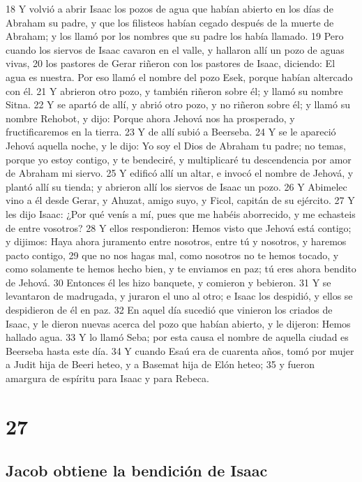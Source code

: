 18 Y volvió a abrir Isaac los pozos de agua que habían abierto en los días de Abraham su padre, y que los filisteos habían cegado después de la muerte de Abraham; y los llamó por los nombres que su padre los había llamado.
19 Pero cuando los siervos de Isaac cavaron en el valle, y hallaron allí un pozo de aguas vivas,
20 los pastores de Gerar riñeron con los pastores de Isaac, diciendo: El agua es nuestra. Por eso llamó el nombre del pozo Esek, porque habían altercado con él.
21 Y abrieron otro pozo, y también riñeron sobre él; y llamó su nombre Sitna.
22 Y se apartó de allí, y abrió otro pozo, y no riñeron sobre él; y llamó su nombre Rehobot, y dijo: Porque ahora Jehová nos ha prosperado, y fructificaremos en la tierra.
23 Y de allí subió a Beerseba.
24 Y se le apareció Jehová aquella noche, y le dijo: Yo soy el Dios de Abraham tu padre; no temas, porque yo estoy contigo, y te bendeciré, y multiplicaré tu descendencia por amor de Abraham mi siervo.
25 Y edificó allí un altar, e invocó el nombre de Jehová, y plantó allí su tienda; y abrieron allí los siervos de Isaac un pozo.
26 Y Abimelec vino a él desde Gerar, y Ahuzat, amigo suyo, y Ficol, capitán de su ejército.
27 Y les dijo Isaac: ¿Por qué venís a mí, pues que me habéis aborrecido, y me echasteis de entre vosotros?
28 Y ellos respondieron: Hemos visto que Jehová está contigo; y dijimos: Haya ahora juramento entre nosotros, entre tú y nosotros, y haremos pacto contigo,
29 que no nos hagas mal, como nosotros no te hemos tocado, y como solamente te hemos hecho bien, y te enviamos en paz; tú eres ahora bendito de Jehová.
30 Entonces él les hizo banquete, y comieron y bebieron.
31 Y se levantaron de madrugada, y juraron el uno al otro; e Isaac los despidió, y ellos se despidieron de él en paz.
32 En aquel día sucedió que vinieron los criados de Isaac, y le dieron nuevas acerca del pozo que habían abierto, y le dijeron: Hemos hallado agua.
33 Y lo llamó Seba; por esta causa el nombre de aquella ciudad es Beerseba hasta este día.
34 Y cuando Esaú era de cuarenta años, tomó por mujer a Judit hija de Beeri heteo, y a Basemat hija de Elón heteo;
35 y fueron amargura de espíritu para Isaac y para Rebeca.

\chapter{27}

\section*{Jacob obtiene la bendición de Isaac}

